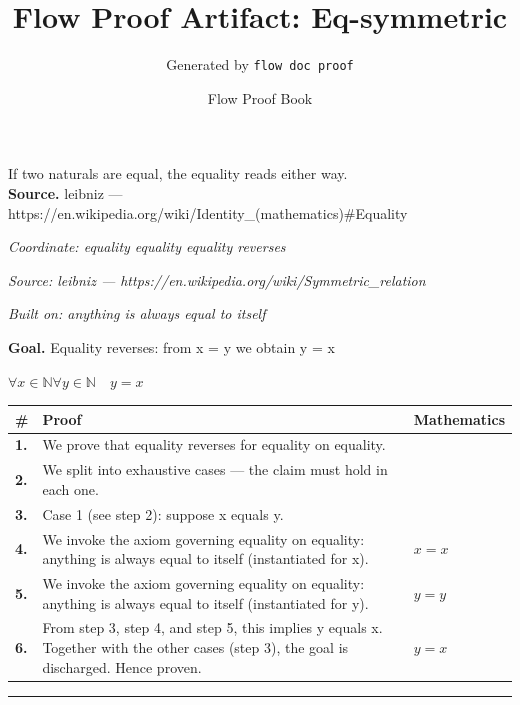 \documentclass[11pt]{article}
\title{Flow Proof Artifact: Eq-symmetric}
\author{Generated by \texttt{flow doc proof}}
\date{Flow Proof Book}
\theoremstyle{definition}
\begin{document}
\maketitle
If two naturals are equal, the equality reads either way.\\[0.5em]
\textbf{Source.} leibniz — https://en.wikipedia.org/wiki/Identity\_(mathematics)\#Equality\\[0.5em]
\bigskip
{}\par
\smallskip\noindent\textit{Coordinate: equality \cdot equality \cdot equality reverses}\par
\smallskip\noindent\textit{Source: leibniz — https://en.wikipedia.org/wiki/Symmetric\_relation}\par
\smallskip\noindent\textit{Built on: anything is always equal to itself}\par
\medskip
\noindent\textbf{Goal.} Equality reverses: from x = y we obtain y = x\par
\noindent$\displaystyle \forall x \in \mathbb{N} \forall y \in \mathbb{N}\quad y = x$\par
\medskip
\noindent
\begin{tabular}{@{} >{\raggedright\arraybackslash}p{} >{\raggedright\arraybackslash}p{} >{\raggedleft\arraybackslash}p{} @{}}
\textbf{\#} & \textbf{Proof} & \textbf{Mathematics} \\
\midrule
\textbf{1.} & We prove that equality reverses for equality on equality. & \\[0.45em]
\textbf{2.} & We split into exhaustive cases — the claim must hold in each one. & \\[0.45em]
\textbf{3.} & Case 1 (see step 2): suppose x  equals  y. & \\[0.45em]
\textbf{4.} & We invoke the axiom governing equality on equality: anything is always equal to itself (instantiated for x). & $\displaystyle x = x$ \\[0.45em]
\textbf{5.} & We invoke the axiom governing equality on equality: anything is always equal to itself (instantiated for y). & $\displaystyle y = y$ \\[0.45em]
\textbf{6.} & From step 3, step 4, and step 5, this implies y equals x. Together with the other cases (step 3), the goal is discharged. Hence proven. & $\displaystyle y = x$ \\[0.45em]
\bottomrule
\end{tabular}
\label{thm:Eq-equality-equality_reverses}
\par\medskip\hrule
\end{document}
